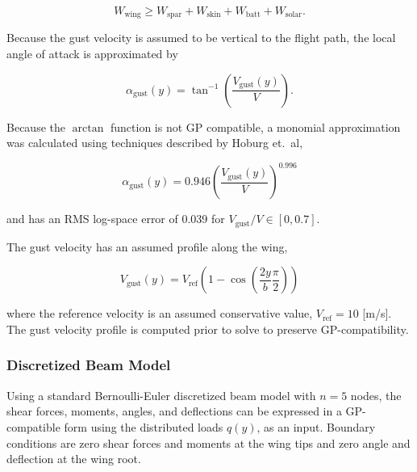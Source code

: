 \begin{equation}
    W_{\text{wing}} \geq W_{\text{spar}} + W_{\text{skin}} + W_{\text{batt}} + W_{\text{solar}}.
\end{equation}

Because the gust velocity is assumed to be vertical to the flight path, the local angle of attack is approximated by 

\begin{equation}
    \label{e:gustalpha}
    \alpha_{\text{gust}}(y)  = \tan^{-1}\left(\frac{V_{\text{gust}}(y)}{V} \right).
\end{equation}

Because the $\arctan$ function is not GP compatible, a monomial approximation was calculated using techniques described by Hoburg et.~al\cite{fitting},

\begin{equation}
    \alpha_{\text{gust}}(y)  = 0.946 \left(\frac{V_{\text{gust}}(y)}{V} \right)^{0.996}
\end{equation}

and has an RMS log-space error of 0.039 for $V_{\text{gust}}/V \in [0, 0.7]$.

The gust velocity has an assumed profile along the wing\cite{acgust},

\begin{equation}
    \label{e:gustwind}
    V_{\text{gust}}(y) = V_{\text{ref}} \left(1-\cos\left(\frac{2y}{b} \frac{\pi}{2} \right) \right)
\end{equation}

where the reference velocity is an assumed conservative value\cite{acgust}, $V_{\text{ref}} = 10$ [m/s]. The gust velocity profile is computed prior to solve to preserve GP-compatibility.

\subsubsection{Discretized Beam Model}

Using a standard Bernoulli-Euler discretized beam model with $n=5$ nodes, the shear forces, moments, angles, and deflections can be expressed in a GP-compatible form using the distributed loads $q(y)$, as an input. Boundary conditions are zero shear forces and moments at the wing tips and zero angle and deflection at the wing root.\cite{bending}

